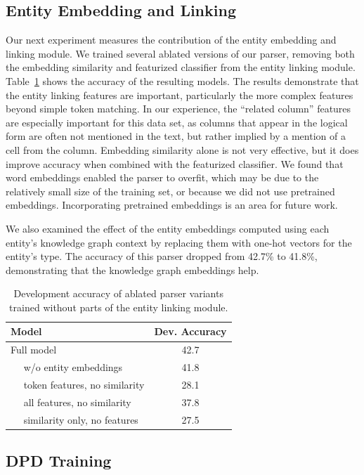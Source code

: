 \subsection{Entity Embedding and Linking}

Our next experiment measures the contribution of the entity embedding and linking module. We trained several ablated versions of our parser,
removing both the embedding similarity and featurized classifier from the entity linking module. Table~\ref{tab:el_results} shows the accuracy
of the resulting models. The results demonstrate that the entity linking features are important, particularly the more complex features beyond simple token matching. In our experience, the ``related column'' features are especially important for this data set, as columns that appear in the logical form are often not mentioned in the text, but rather implied by a mention of a cell from the column. Embedding similarity alone is not very effective, but it does improve accuracy when combined with the featurized classifier. We found that word embeddings enabled the parser to overfit, which may be due to the relatively small size of the training set, or because we did not use pretrained embeddings. Incorporating pretrained embeddings is an area for future work.

We also examined the effect of the entity embeddings computed using each entity's knowledge graph context by replacing them with one-hot vectors for the entity's type. The accuracy of this parser dropped from 42.7\% to 41.8\%, demonstrating that the knowledge graph embeddings help.

\begin{table}
	\centering
	\begin{tabular}{lc} \toprule
	\textbf{Model} & \textbf{Dev. Accuracy} \\ \midrule 
	Full model & 42.7 \\ 
        ~~ w/o entity embeddings & 41.8 \\
	~~ token features, no similarity & 28.1 \\
	~~ all features, no similarity & 37.8 \\
	~~ similarity only, no features & 27.5 \\ \bottomrule
	\end{tabular}
	\caption{Development accuracy of ablated parser variants trained without parts of the entity linking module.}\label{tab:el_results}
\end{table}

\subsection{DPD Training}
\label{sec:experiments_dpd}

